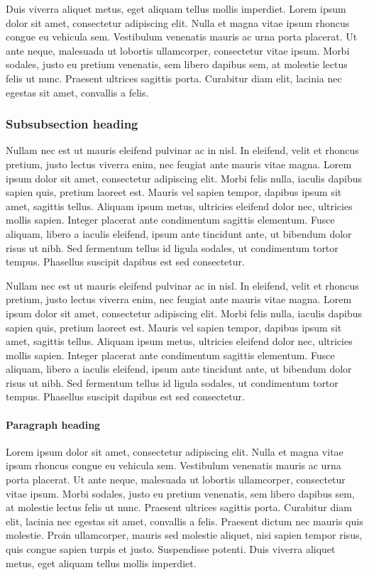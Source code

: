 \documentclass[doc,longtable]{apa6}
\begin{document}
Duis viverra aliquet metus, eget aliquam tellus mollis imperdiet. Lorem ipsum dolor sit amet, consectetur adipiscing elit. Nulla et magna vitae ipsum rhoncus congue eu vehicula sem. Vestibulum venenatis mauris ac urna porta placerat. Ut ante neque, malesuada ut lobortis ullamcorper, consectetur vitae ipsum. Morbi sodales, justo eu pretium venenatis, sem libero dapibus sem, at molestie lectus felis ut nunc. Praesent ultrices sagittis porta. Curabitur diam elit, lacinia nec egestas sit amet, convallis a felis.

\subsubsection{Subsubsection heading}\label{subsubsection-heading}

Nullam nec est ut mauris eleifend pulvinar ac in nisl. In eleifend, velit et rhoncus pretium, justo lectus viverra enim, nec feugiat ante mauris vitae magna. Lorem ipsum dolor sit amet, consectetur adipiscing elit. Morbi felis nulla, iaculis dapibus sapien quis, pretium laoreet est. Mauris vel sapien tempor, dapibus ipsum sit amet, sagittis tellus. Aliquam ipsum metus, ultricies eleifend dolor nec, ultricies mollis sapien. Integer placerat ante condimentum sagittis elementum. Fusce aliquam, libero a iaculis eleifend, ipsum ante tincidunt ante, ut bibendum dolor risus ut nibh. Sed fermentum tellus id ligula sodales, ut condimentum tortor tempus. Phasellus suscipit dapibus est sed consectetur.

Nullam nec est ut mauris eleifend pulvinar ac in nisl. In eleifend, velit et rhoncus pretium, justo lectus viverra enim, nec feugiat ante mauris vitae magna. Lorem ipsum dolor sit amet, consectetur adipiscing elit. Morbi felis nulla, iaculis dapibus sapien quis, pretium laoreet est. Mauris vel sapien tempor, dapibus ipsum sit amet, sagittis tellus. Aliquam ipsum metus, ultricies eleifend dolor nec, ultricies mollis sapien. Integer placerat ante condimentum sagittis elementum. Fusce aliquam, libero a iaculis eleifend, ipsum ante tincidunt ante, ut bibendum dolor risus ut nibh. Sed fermentum tellus id ligula sodales, ut condimentum tortor tempus. Phasellus suscipit dapibus est sed consectetur.

\paragraph{Paragraph heading}\label{paragraph-heading}

Lorem ipsum dolor sit amet, consectetur adipiscing elit. Nulla et magna vitae ipsum rhoncus congue eu vehicula sem. Vestibulum venenatis mauris ac urna porta placerat. Ut ante neque, malesuada ut lobortis ullamcorper, consectetur vitae ipsum. Morbi sodales, justo eu pretium venenatis, sem libero dapibus sem, at molestie lectus felis ut nunc. Praesent ultrices sagittis porta. Curabitur diam elit, lacinia nec egestas sit amet, convallis a felis. Praesent dictum nec mauris quis molestie. Proin ullamcorper, mauris sed molestie aliquet, nisi sapien tempor risus, quis congue sapien turpis et justo. Suspendisse potenti. Duis viverra aliquet metus, eget aliquam tellus mollis imperdiet.
\end{document}
